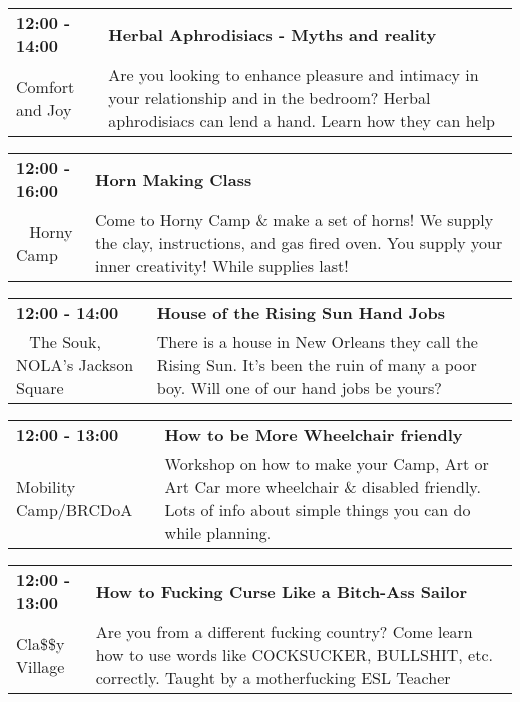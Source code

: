 \begin{tabular}{ p{1in} p{2.2in} }
    \textbf{12:00 - 14:00} & \textbf{Herbal Aphrodisiacs - Myths and reality} \\
    Comfort and Joy \newline  & Are you looking to enhance pleasure and intimacy in your relationship and in the bedroom? Herbal aphrodisiacs can lend a hand. Learn how they can help \\
    \hline 
\end{tabular}
    
\begin{tabular}{ p{1in} p{2.2in} }
    \textbf{12:00 - 16:00} & \textbf{Horn Making Class} \\
    ~ \newline Horny Camp & Come to Horny Camp \& make a set of horns! We supply the clay, instructions, and gas fired oven. You supply your inner creativity! While supplies last! \\
    \hline 
\end{tabular}
    
\begin{tabular}{ p{1in} p{2.2in} }
    \textbf{12:00 - 14:00} & \textbf{House of the Rising Sun Hand Jobs} \\
    ~ \newline The Souk, NOLA's Jackson Square  & There is a house in New Orleans they call the Rising Sun. It's been the ruin of many a poor boy. Will one of our hand jobs be yours? \\
    \hline 
\end{tabular}
    
\begin{tabular}{ p{1in} p{2.2in} }
    \textbf{12:00 - 13:00} & \textbf{How to be More Wheelchair friendly} \\
    Mobility Camp/BRCDoA \newline  & Workshop on how to make your Camp, Art or Art Car more wheelchair \& disabled friendly. Lots of info about simple things you can do while planning. \\
    \hline 
\end{tabular}
    
\begin{tabular}{ p{1in} p{2.2in} }
    \textbf{12:00 - 13:00} & \textbf{How to Fucking Curse Like a Bitch-Ass Sailor} \\
    Cla\$\$y Village \newline  & Are you from a different fucking country? Come learn how to use words like COCKSUCKER, BULLSHIT, etc. correctly. Taught by a motherfucking ESL Teacher \\
    \hline 
\end{tabular}
    
